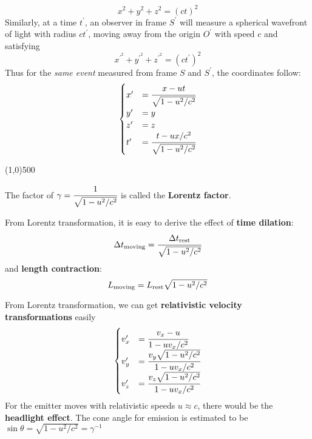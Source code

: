 \documentclass{article}
\numberwithin{equation}{section}
\numberwithin{figure}{section}
\newcommand{\hr}{\begin{center} \line(1,0){500} \end{center}}
\begin{document}
	\begin{equation}
		x^2 + y^2 + z^2 = (ct)^2
	\end{equation}
	Similarly, at a time $t^\prime$, an observer in frame $S^\prime$ will measure a spherical wavefront of light with radius $ct^\prime$, moving away from the origin $O^\prime$ with speed $c$ and satisfying
	\begin{equation}
		x^{\prime^2} + y^{\prime^2} + z^{\prime^2} = (ct^\prime)^2
	\end{equation}
	Thus for the {\it same event} measured from frame $S$ and $S^\prime$, the coordinates follow:
	\begin{equation}
		\begin{cases}
		x^\prime &= \cfrac{x-ut}{\sqrt{1-u^2/c^2}} \\
		y^\prime &= y \\
		z^\prime &= z \\
		t^\prime &= \cfrac{t-ux/c^2}{\sqrt{1-u^2/c^2}}
		\end{cases}
	\end{equation}
	\hr
	
	The factor of $\gamma = \cfrac{1}{\sqrt{1-u^2/c^2}}$ is called the {\bf Lorentz factor}.
	
	From Lorentz transformation, it is easy to derive the effect of {\bf time dilation}:
	\begin{equation}
		\Delta t_{\rm moving} = \cfrac{\Delta t_{\rm rest}}{\sqrt{1-u^2/c^2}}
	\end{equation}
	and {\bf length contraction}:
	\begin{equation}
		L_{\rm moving} = L_{\rm rest}\sqrt{1-u^2/c^2}
	\end{equation}
	
	From Lorentz transformation, we can get {\bf relativistic velocity transformations} easily
	\begin{equation}
		\begin{cases}
			v_x^\prime &= \cfrac{v_x - u}{1-uv_x/c^2} \\
			v_y^\prime &= \cfrac{v_y\sqrt{1-u^2/c^2}}{1-uv_x/c^2} \\
			v_z^\prime &= \cfrac{v_z\sqrt{1-u^2/c^2}}{1-uv_x/c^2} \\
		\end{cases}
	\end{equation}
	For the emitter moves with relativistic speeds $u\approx c$, there would be the {\bf headlight effect}. The cone angle for emission is estimated to be $\sin\theta = \sqrt{1-u^2/c^2} = \gamma^{-1}$
	
\end{document}

